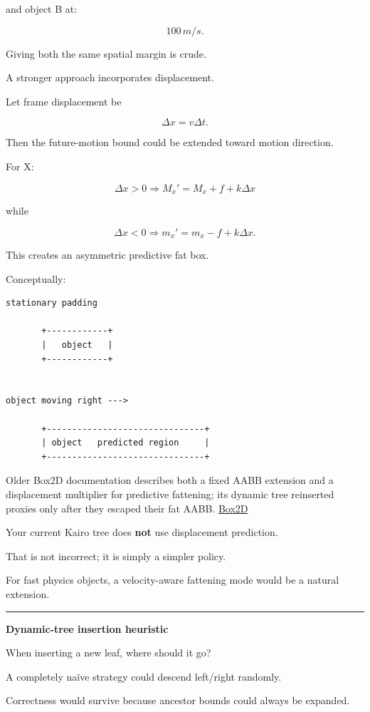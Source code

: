 and object B at:

\[
100\,m/s.
\]

Giving both the same spatial margin is crude.

A stronger approach incorporates displacement.

Let frame displacement be

\[
\Delta x=v\Delta t.
\]

Then the future-motion bound could be extended toward motion direction.

For X:

\[
\Delta x>0
\Rightarrow
M_x'=M_x+f+k\Delta x
\]

while

\[
\Delta x<0
\Rightarrow
m_x'=m_x-f+k\Delta x.
\]

This creates an asymmetric predictive fat box.

Conceptually:

\begin{verbatim}
stationary padding

       +------------+
       |   object   |
       +------------+


object moving right --->

       +-------------------------------+
       | object   predicted region     |
       +-------------------------------+
\end{verbatim}

Older Box2D documentation describes both a fixed AABB extension and a displacement multiplier for predictive fattening; its dynamic tree reinserted proxies only after they escaped their fat AABB. \href{https://box2d.org/doc_version_2_4/classb2_dynamic_tree.html?utm_source=chatgpt.com}{Box2D}

Your current Kairo tree does \textbf{not} use displacement prediction.

That is not incorrect; it is simply a simpler policy.

For fast physics objects, a velocity-aware fattening mode would be a natural extension.

\begin{center}\rule{0.5\linewidth}{0.5pt}\end{center}

\textbf{Dynamic-tree insertion heuristic}

When inserting a new leaf, where should it go?

A completely naïve strategy could descend left/right randomly.

Correctness would survive because ancestor bounds could always be expanded.

